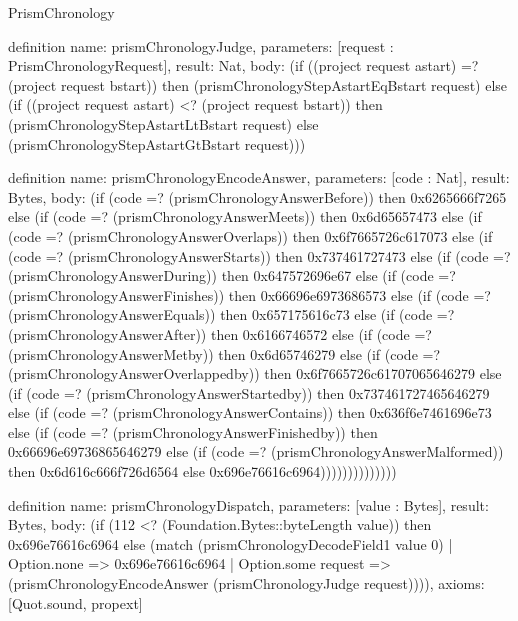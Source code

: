 \begin{lexlean}{PrismChronology}
\begin{semanticmodule}
definition{
  name: prismChronologyJudge,
  parameters: [request : PrismChronologyRequest],
  result: Nat,
  body: (if ((project request astart) =? (project request bstart)) then (prismChronologyStepAstartEqBstart request) else (if ((project request astart) <? (project request bstart)) then (prismChronologyStepAstartLtBstart request) else (prismChronologyStepAstartGtBstart request)))
}

definition{
  name: prismChronologyEncodeAnswer,
  parameters: [code : Nat],
  result: Bytes,
  body: (if (code =? (prismChronologyAnswerBefore)) then 0x6265666f7265 else (if (code =? (prismChronologyAnswerMeets)) then 0x6d65657473 else (if (code =? (prismChronologyAnswerOverlaps)) then 0x6f7665726c617073 else (if (code =? (prismChronologyAnswerStarts)) then 0x737461727473 else (if (code =? (prismChronologyAnswerDuring)) then 0x647572696e67 else (if (code =? (prismChronologyAnswerFinishes)) then 0x66696e6973686573 else (if (code =? (prismChronologyAnswerEquals)) then 0x657175616c73 else (if (code =? (prismChronologyAnswerAfter)) then 0x6166746572 else (if (code =? (prismChronologyAnswerMetby)) then 0x6d65746279 else (if (code =? (prismChronologyAnswerOverlappedby)) then 0x6f7665726c61707065646279 else (if (code =? (prismChronologyAnswerStartedby)) then 0x737461727465646279 else (if (code =? (prismChronologyAnswerContains)) then 0x636f6e7461696e73 else (if (code =? (prismChronologyAnswerFinishedby)) then 0x66696e69736865646279 else (if (code =? (prismChronologyAnswerMalformed)) then 0x6d616c666f726d6564 else 0x696e76616c6964))))))))))))))
}

definition{
  name: prismChronologyDispatch,
  parameters: [value : Bytes],
  result: Bytes,
  body: (if (112 <? (Foundation.Bytes::byteLength value)) then 0x696e76616c6964 else (match (prismChronologyDecodeField1 value 0)
    | Option.none => 0x696e76616c6964
    | Option.some request => (prismChronologyEncodeAnswer (prismChronologyJudge request)))),
  axioms: [Quot.sound, propext]
}
\end{semanticmodule}
\end{lexlean}

